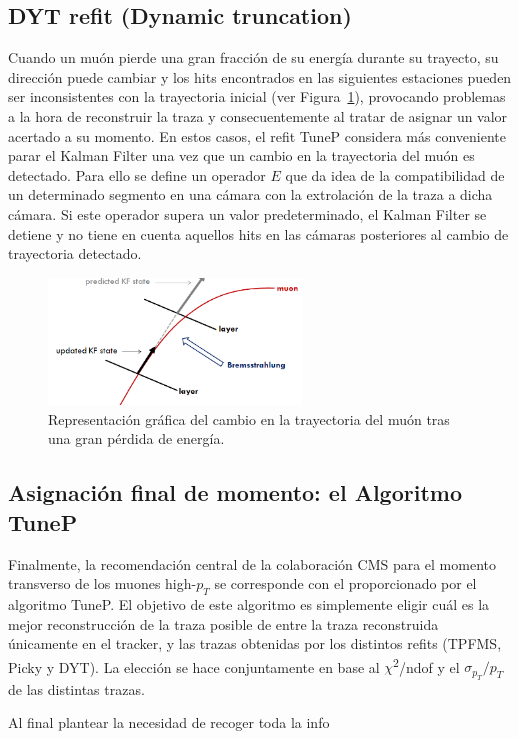 \subsection{DYT refit (Dynamic truncation)}\label{sec:DYT}

Cuando un mu\'on pierde una gran fracci\'on de su energ\'ia durante su trayecto, su direcci\'on puede cambiar y los hits encontrados en las siguientes estaciones pueden ser inconsistentes con la trayectoria inicial (ver Figura~\ref{fig:energyloss}), provocando problemas a la hora de reconstruir la traza y consecuentemente al tratar de asignar un valor acertado a su momento. En estos casos, el refit TuneP considera m\'as conveniente parar el Kalman Filter una vez que un cambio en la trayectoria del mu\'on es detectado. Para ello se define un operador $E$ que da idea de la compatibilidad de un determinado segmento en una c\'amara con la extrolaci\'on de la traza a dicha c\'amara. Si este operador supera un valor predeterminado, el Kalman Filter se detiene y no tiene en cuenta aquellos hits en las c\'amaras posteriores al cambio de trayectoria detectado. 

\begin{figure}
\centering
\includegraphics[width=0.60\textwidth]{figures/energyloss.png}
\caption{Representaci\'on gr\'afica del cambio en la trayectoria del mu\'on tras una gran p\'erdida de energ\'ia.}
\label{fig:energyloss}        
\end{figure}


\subsection{Asignaci\'on final de momento: el Algoritmo TuneP}\label{sec:TuneP}

Finalmente, la recomendaci\'on central de la colaboraci\'on CMS para el momento transverso de los muones high-$p_{T}$ se corresponde con el proporcionado por el algoritmo TuneP. El objetivo de este algoritmo es simplemente eligir cu\'al es la mejor reconstrucci\'on de la traza posible de entre la traza reconstruida \'unicamente en el tracker, y las trazas obtenidas por los distintos refits (TPFMS, Picky y DYT). La elecci\'on se hace conjuntamente en base al $\chi$\textsuperscript{2}/ndof y el $\sigma_{p_{T}}/p_{T}$ de las distintas trazas.


{\color{red} Al final plantear la necesidad de recoger toda la info}
